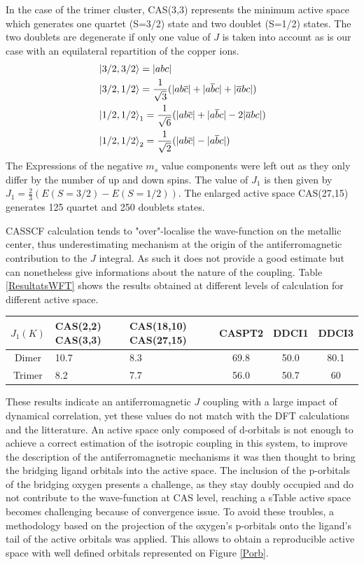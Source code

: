 \documentclass[10pt]{report}
\numberwithin{equation}{section}
\begin{document}
In the case of the trimer cluster, CAS(3,3) represents the minimum active space which generates one quartet (S=3/2) state and two doublet (S=1/2) states. The two doublets are degenerate if only one value of $J$ is taken into account as is our case with an equilateral repartition of the copper ions.
\begin{align}
    &\ket{3/2,3/2}=|abc|\\
    &\ket{3/2,1/2}=\frac{1}{\sqrt{3}}(|ab\overline{c}|+|a\overline{b}c|+|\overline{a}bc|)\\
    &\ket{1/2,1/2}_1=\frac{1}{\sqrt{6}}(|ab\overline{c}|+|a\overline{b}c|-2|\overline{a}bc|)\\
    &\ket{1/2,1/2}_2=\frac{1}{\sqrt{2}}(|ab\overline{c}|-|a\overline{b}c|)
\end{align}
The Expressions of the negative $m_s$ value components were left out as they only differ by the number of up and down spins.
The value of $J_1$ is then given by $J_1=\frac{2}{3}(E(S=3/2)-E(S=1/2))$.
The enlarged active space CAS(27,15) generates 125 quartet and 250 doublets states.

CASSCF calculation tends to "over"-localise the wave-function on the metallic center, thus underestimating mechanism at the origin of the antiferromagnetic contribution to the $J$ integral.
As such it does not provide a good estimate but can nonetheless give informations about the nature of the coupling.
Table \ref{ResultatsWFT} shows the results obtained at different levels of calculation for different active space.

\begin{center}\label{ResultatsWFT}
    \begin{tabular}{c m{8em} m{10em} c c c }
        \hline
        $J_1 (K)$ & CAS(2,2) CAS(3,3) & CAS(18,10) CAS(27,15) & CASPT2 & DDCI1  & DDCI3  \\
        \hline
        Dimer & 10.7 & 8.3 & 69.8 & 50.0 & 80.1 \\
        Trimer & 8.2 & 7.7 & 56.0  & 50.7 & 60 \\
        \hline
    \end{tabular}
\end{center}

These results indicate an antiferromagnetic $J$ coupling with a large impact of dynamical correlation, yet these values do not match with the DFT calculations and the litterature.
An active space only composed of d-orbitals is not enough to achieve a correct estimation of the isotropic coupling in this system, to improve the description of the antiferromagnetic mechanisms it was then thought to bring the bridging ligand orbitals into the active space.
The inclusion of the p-orbitals of the bridging oxygen presents a challenge, as they stay doubly occupied and do not contribute to the wave-function at CAS level, reaching a sTable active space becomes challenging because of convergence issue.
To avoid these troubles, a methodology based on the projection of the oxygen's p-orbitals onto the ligand's tail of the active orbitals was applied.
This allows to obtain a reproducible active space with well defined orbitals represented on Figure \ref{Porb}.
\end{document}
